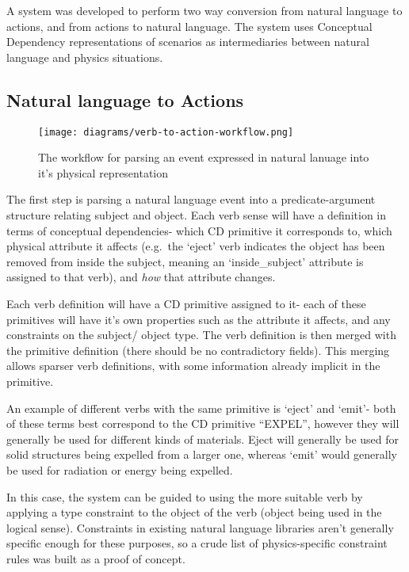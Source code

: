 \documentclass[dissertation.tex]{subfiles}
\begin{document}

    A system was developed to perform two way conversion from natural language to actions, and from actions to natural language. The system uses Conceptual Dependency representations of scenarios as intermediaries between natural language and physics situations.

    \subsection{Natural language to Actions}
    \begin{figure}[h]
        \begin{center}
            \texttt{[image: diagrams/verb-to-action-workflow.png]}
        \end{center}
        \caption{The workflow for parsing an event expressed in natural lanuage into it's physical representation}
    \end{figure}

    The first step is parsing a natural language event into a predicate-argument structure relating subject and object. Each verb sense will have a definition in terms of conceptual dependencies- which CD primitive it corresponds to, which physical attribute it affects (e.g.~the `eject' verb indicates the object has been removed from inside the subject, meaning an `inside\_subject' attribute is assigned to that verb), and \emph{how} that attribute changes.

    Each verb definition will have a CD primitive assigned to it- each of these primitives will have it's own properties such as the attribute it affects, and any constraints on the subject/ object type. The verb definition is then merged with the primitive definition (there should be no contradictory fields). This merging allows sparser verb definitions, with some information already implicit in the primitive.

    An example of different verbs with the same primitive is `eject' and `emit'- both of these terms best correspond to the CD primitive ``EXPEL'', however they will generally be used for different kinds of materials. Eject will generally be used for solid structures being expelled from a larger one, whereas `emit' would generally be used for radiation or energy being expelled.

    In this case, the system can be guided to using the more suitable verb by applying a type constraint to the object of the verb (object being used in the logical sense). Constraints in existing natural language libraries aren't generally specific enough for these purposes, so a crude list of physics-specific constraint rules was built as a proof of concept.
    
\end{document}
